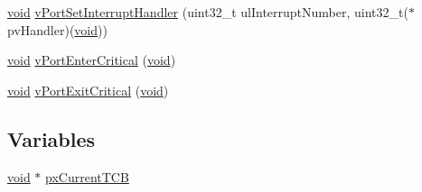 \begin{DoxyCompactItemize}
\hyperlink{Paradigm_2Tern__EE_2small_2portmacro_8h_a14d32f8130d3c0b212cfc751730b5b49}{void} \hyperlink{MSVC-MingW_2port_8c_a35b5d3a9b147da8e3adda2a2cc7b6cc0}{v\-Port\-Set\-Interrupt\-Handler} (uint32\-\_\-t ul\-Interrupt\-Number, uint32\-\_\-t($\ast$pv\-Handler)(\hyperlink{Paradigm_2Tern__EE_2small_2portmacro_8h_a14d32f8130d3c0b212cfc751730b5b49}{void}))
\item 
\hyperlink{Paradigm_2Tern__EE_2small_2portmacro_8h_a14d32f8130d3c0b212cfc751730b5b49}{void} \hyperlink{MSVC-MingW_2port_8c_a2ed3554a3de09a3bd09d396ee081ab69}{v\-Port\-Enter\-Critical} (\hyperlink{Paradigm_2Tern__EE_2small_2portmacro_8h_a14d32f8130d3c0b212cfc751730b5b49}{void})
\item 
\hyperlink{Paradigm_2Tern__EE_2small_2portmacro_8h_a14d32f8130d3c0b212cfc751730b5b49}{void} \hyperlink{MSVC-MingW_2port_8c_aed20ada05b957181a0de042802a82a5b}{v\-Port\-Exit\-Critical} (\hyperlink{Paradigm_2Tern__EE_2small_2portmacro_8h_a14d32f8130d3c0b212cfc751730b5b49}{void})
\end{DoxyCompactItemize}
\subsection*{Variables}
\begin{DoxyCompactItemize}
\item 
\hyperlink{Paradigm_2Tern__EE_2small_2portmacro_8h_a14d32f8130d3c0b212cfc751730b5b49}{void} $\ast$ \hyperlink{MSVC-MingW_2port_8c_a8492c047932aa45cec6a7b6351206b38}{px\-Current\-T\-C\-B}
\end{DoxyCompactItemize}


